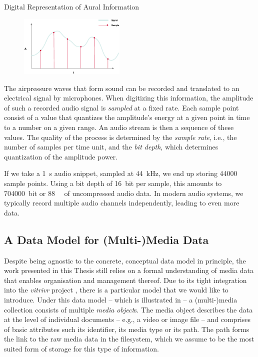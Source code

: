 \begin{example}[label=example:representation_audio_information]{Digital Representation of Aural Information}{}
    \begin{figure}
        \includegraphics[width=0.45\textwidth]{figures/example-audio-signal.eps}
    \end{figure}
    The airpressure waves that form sound can be recorded and translated to an electrical signal by microphones. When digitizing this information, the amplitude of such a recorded audio signal is \emph{sampled} at a fixed rate. Each sample point consist of a value that quantizes the amplitude's energy at a given point in time to a number on a given range. An audio stream is then a sequence of these values. The quality of the process is determined by the \emph{sample rate}, i.e., the number of samples per time unit, and the \emph{bit depth}, which determines quantization of the amplitude power.

    If we take a \SI{1}{\second} audio snippet, sampled at \SI{44}{\kilo\hertz}, we end up storing \num{44000} sample points. Using a bit depth of \SI{16}{bit} per sample, this amounts to \SI{704000}{bit} or \SI{88}{\kilo\byte} of uncompressed audio data. In modern audio systems, we typically record multiple audio channels independently, leading to even more data.
\end{example}

\subsection{A Data Model for (Multi-)Media Data}
\label{section:media_data_model}
Despite being agnostic to the concrete, conceptual data model in principle, the work presented in this Thesis still relies on a formal understanding of media data that enables organisation and management thereof. Due to its tight integration into the \emph{vitrivr} project \cite{Rossetto:2016vitrivr,Gasser:2019multimodal,Heller:2020multi}, there is a particular model that we would like to introduce. Under this data model -- which is illustrated in  -- a (multi-)media collection consists of multiple \emph{media object}s. The media object describes the data at the level of individual documents -- e.g., a video or image file -- and comprises of basic attributes such its identifier, its media type or its path. The path forms the link to the raw media data in the filesystem, which we assume to be the most suited form of storage for this type of information. 

